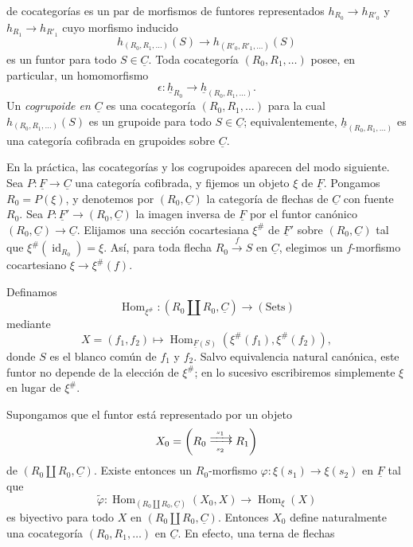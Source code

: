 
de cocategorías es un par de morfismos de funtores representados
$h_{R_0}\longrightarrow h_{R'_0}$ y
$h_{R_1}\longrightarrow h_{R'_1}$ cuyo morfismo inducido
\[
 h_{(R_0,R_1,\ldots)}(S)
 \longrightarrow h_{(R'_0,R'_1,\ldots)}(S)
\]
es un funtor para todo $S\in\underline C$. Toda cocategoría
$(R_0,R_1,\ldots)$ posee, en particular, un homomorfismo
\[
 \epsilon:\underline h_{R_0}
 \longrightarrow\underline h_{(R_0,R_1,\ldots)}.
\]
Un \emph{cogrupoide en $\underline C$} es una cocategoría
$(R_0,R_1,\ldots)$ para la cual $h_{(R_0,R_1,\ldots)}(S)$ es un
grupoide para todo $S\in\underline C$; equivalentemente,
$\underline h_{(R_0,R_1,\ldots)}$ es una categoría cofibrada en
grupoides sobre $\underline C$.

En la práctica, las cocategorías y los cogrupoides aparecen del modo
siguiente. Sea $P:\underline F\longrightarrow\underline C$ una
categoría cofibrada, y fijemos un objeto $\xi$ de $\underline F$.
Pongamos $R_0=P(\xi)$, y denotemos por $(R_0,\underline C)$ la categoría
de flechas de $\underline C$ con fuente $R_0$. Sea
$P:\underline F'\longrightarrow(R_0,\underline C)$ la imagen inversa de
$\underline F$ por el funtor canónico
$(R_0,\underline C)\longrightarrow\underline C$. Elijamos una sección
cocartesiana $\xi^{\#}$ de $\underline F'$ sobre
$(R_0,\underline C)$ tal que
$\xi^{\#}(\operatorname{id}_{R_0})=\xi$. Así, para toda flecha
$R_0\xrightarrow fS$ en $\underline C$, elegimos un $f$-morfismo
cocartesiano $\xi\longrightarrow\xi^{\#}(f)$.

Definamos
\[
 \operatorname{Hom}_{\xi^{\#}}:
 (R_0\amalg R_0,\underline C)\longrightarrow(\mathrm{Sets})
\]
mediante
\[
 X=(f_1,f_2)\longmapsto
 \operatorname{Hom}_{\underline F(S)}
   (\xi^{\#}(f_1),\xi^{\#}(f_2)),
\]
donde $S$ es el blanco común de $f_1$ y $f_2$. Salvo equivalencia
natural canónica, este funtor no depende de la elección de $\xi^{\#}$;
en lo sucesivo escribiremos simplemente $\xi$ en lugar de $\xi^{\#}$.

Supongamos que el funtor está representado por un objeto
\[
 X_0=
 \left(R_0\sisi{\overset{s_1}{\underset{s_2}{=\!=}}}{\mathrel{\substack{\xrightarrow{\ s_1\ }\\[-.6ex]
                              \xrightarrow[\ s_2\ ]{}}}}R_1\right)
\]
de $(R_0\amalg R_0,\underline C)$. Existe entonces un $R_0$-morfismo
$\varphi:\xi(s_1)\longrightarrow\xi(s_2)$ en $\underline F$ tal que
\[
 \widetilde\varphi:
 \operatorname{Hom}_{(R_0\amalg R_0,\underline C)}(X_0,X)
 \longrightarrow\operatorname{Hom}_\xi(X)
\]
es biyectivo para todo $X$ en $(R_0\amalg R_0,\underline C)$. Entonces
$X_0$ define naturalmente una cocategoría $(R_0,R_1,\ldots)$ en
$\underline C$. En efecto, una terna de flechas

